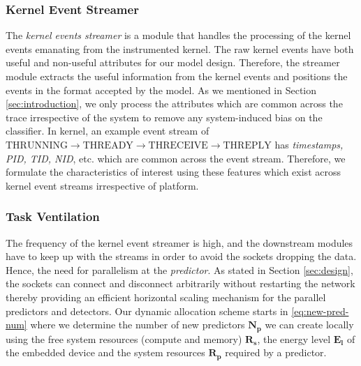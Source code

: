 \subsubsection*{Kernel Event Streamer}
\label{subsec:preprocessing}
The \emph{kernel events streamer} is a module that handles the processing of 
the kernel events emanating from the instrumented kernel. The raw kernel events 
have both useful and non-useful attributes for our model design. Therefore, the 
streamer module extracts the useful information from the kernel events and 
positions the events in the format accepted by the model. As we mentioned in 
Section \ref{sec:introduction}, we only process the attributes which are common 
across the trace irrespective of the system to remove any system-induced bias 
on the classifier. In kernel, an 
example event stream of $\text{THRUNNING} \longrightarrow \text{THREADY} 
\longrightarrow \text{THRECEIVE} \longrightarrow \text{THREPLY}$ has 
\emph{timestamps, PID, TID, NID}, etc. which are common across the event 
stream. Therefore, we formulate the characteristics of interest using these 
features which exist across kernel event streams irrespective of platform.
\subsubsection*{Task Ventilation}
\label{subsub:task1}
The frequency of the kernel event streamer is high, and the downstream modules 
have to keep up with the streams in order to avoid the sockets dropping the 
data. Hence, the need for parallelism at the \emph{predictor}. As stated in 
Section \ref{sec:design}, the sockets can connect and disconnect arbitrarily 
without restarting the network thereby providing an efficient horizontal 
scaling mechanism for the parallel predictors and detectors. Our dynamic 
allocation scheme starts in \eqref{eq:new-pred-num} where we determine the 
number of new predictors $ \bm{N_p} $ we can create locally using the free 
system resources (compute and memory) $ \bm{R_{s}} $, the energy level $ 
\bm{E_l} $ of the embedded device and the system resources $ \bm{R_p} $ 
required by a predictor. 

